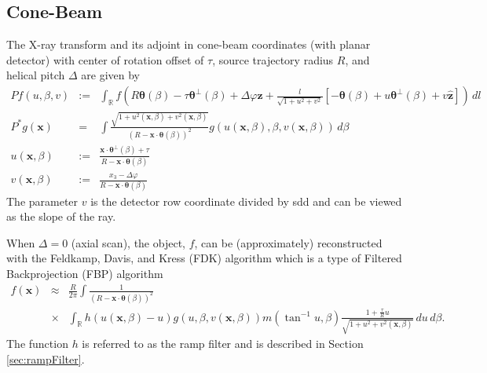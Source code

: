 \documentclass[11pt]{article}
\begin{document}


\subsection{Cone-Beam} \label{sec:conebeamTransform}

The X-ray transform and its adjoint in cone-beam coordinates (with planar detector) with center of rotation offset of $\tau$, source trajectory radius $R$, and helical pitch $\Delta$ are given by
\begin{eqnarray*}
Pf(u,\beta,v) &:=& \int_\mathbb{R} f\left(R\bm{\theta}(\beta) - \tau\bm{\theta}^\perp(\beta) + \Delta\varphi\widehat{\bm{z}}  + \frac{l}{\sqrt{1+u^2+v^2}}\left[-\bm{\theta}(\beta)+u\bm{\theta}^\perp(\beta) + v\widehat{\bm{z}} \right] \right) \, dl \\
P^*g(\bm{x}) &=& \int \frac{\sqrt{1+ u^2(\bm{x},\beta) +v^2(\bm{x},\beta)}}{(R-\bm{x}\cdot\bm{\theta}(\beta))^2} g\left( u(\bm{x},\beta), \beta, v(\bm{x},\beta)\right) \, d\beta \\
u(\bm{x},\beta) &:=& \frac{\bm{x}\cdot \bm{\theta}^\perp(\beta) + \tau}{R - \bm{x}\cdot\bm{\theta}(\beta)} \\
v(\bm{x},\beta) &:=& \frac{x_3 - \Delta\varphi}{R - \bm{x}\cdot\bm{\theta}(\beta)}
\end{eqnarray*}
The parameter $v$ is the detector row coordinate divided by sdd and can be viewed as the slope of the ray.

When $\Delta = 0$ (axial scan), the object, $f$, can be (approximately) reconstructed with the Feldkamp, Davis, and Kress (FDK) algorithm \cite{FDK} which is a type of Filtered Backprojection (FBP) algorithm
\begin{eqnarray*}
f(\bm{x}) &\approx& \frac{R}{2\pi} \int \frac{1}{(R-\bm{x}\cdot\bm{\theta}(\beta))^2} \\ &\times& \int_\mathbb{R} h(u(\bm{x},\beta) - u) g(u,\beta, v(\bm{x},\beta)) m(\tan^{-1}u,\beta) \frac{1+\frac{\tau}{R}u}{\sqrt{1+u^2+v^2(\bm{x},\beta)}} \, du \, d\beta.
\end{eqnarray*}
The function $h$ is referred to as the ramp filter and is described in Section \ref{sec:rampFilter}.
\end{document}
